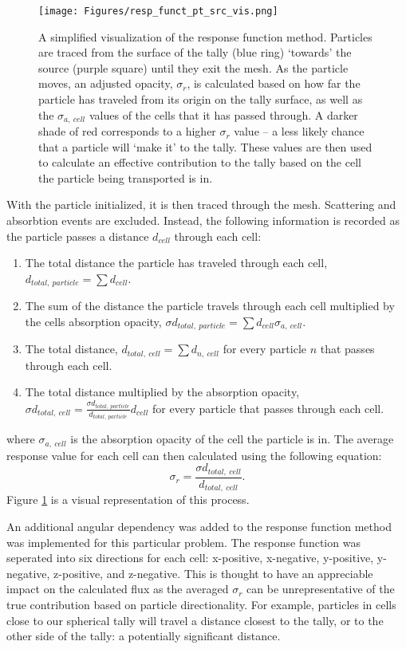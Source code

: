 \begin{chapabstract}
\begin{figure} [h!]
	\centering
	\texttt{[image: Figures/resp\_funct\_pt\_src\_vis.png]}
	\caption{A simplified visualization of the response function method. Particles are traced from the surface of the tally (blue ring) ‘towards’ the source (purple square) until they exit the mesh. As the particle moves, an adjusted opacity, $\sigma_{r}$, is calculated based on how far the particle has traveled from its origin on the tally surface, as well as the $\sigma_{a,~cell}$ values of the cells that it has passed through. A darker shade of red corresponds to a higher $\sigma_{r}$ value – a less likely chance that a particle will ‘make it’ to the tally. These values are then used to calculate an effective contribution to the tally based on the cell the particle being transported is in.}
	\label{fig:resp_funct_visual}
\end{figure}

With the particle initialized, it is then traced through the mesh. Scattering and absorbtion events are excluded. Instead, the following information is recorded as the particle passes a distance $d_{cell}$ through each cell:
\begin{enumerate}
	\item The total distance the particle has traveled through each cell, $d_{total,~particle} = \sum d_{cell}$.
	\item The sum of the distance the particle travels through each cell multiplied by the cells absorption opacity, $\sigma d_{total,~particle} = \sum d_{cell} \sigma_{a,~cell}$.
	\item The total distance, $d_{total,~cell} = \sum d_{n,~cell}$ for every particle $n$ that passes through each cell.
	\item The total distance multiplied by the absorption opacity, $\sigma d_{total,~cell} = \frac{\sigma d_{total,~particle}}{d_{total,~particle}} d_{cell}$ for every particle that passes through each cell.
\end{enumerate}
where $\sigma_{a,~cell}$ is the absorption opacity of the cell the particle is in. The average response value for each cell can then calculated using the following equation:
\begin{equation}
\sigma_{r} = \frac{\sigma d_{total,~cell}}{d_{total,~cell}}.
\end{equation}
Figure \ref{fig:resp_funct_visual} is a visual representation of this process. 


An additional angular dependency was added to the response function method was implemented for this particular problem. The response function was seperated into six directions for each cell: x-positive, x-negative, y-positive, y-negative, z-positive, and z-negative. This is thought to have an appreciable impact on the calculated flux as the averaged $\sigma_{r}$ can be unrepresentative of the true contribution based on particle directionality. For example, particles in cells close to our spherical tally will travel a distance closest to the tally, or to the other side of the tally: a potentially significant 
distance. \\ 


\end{chapabstract}
